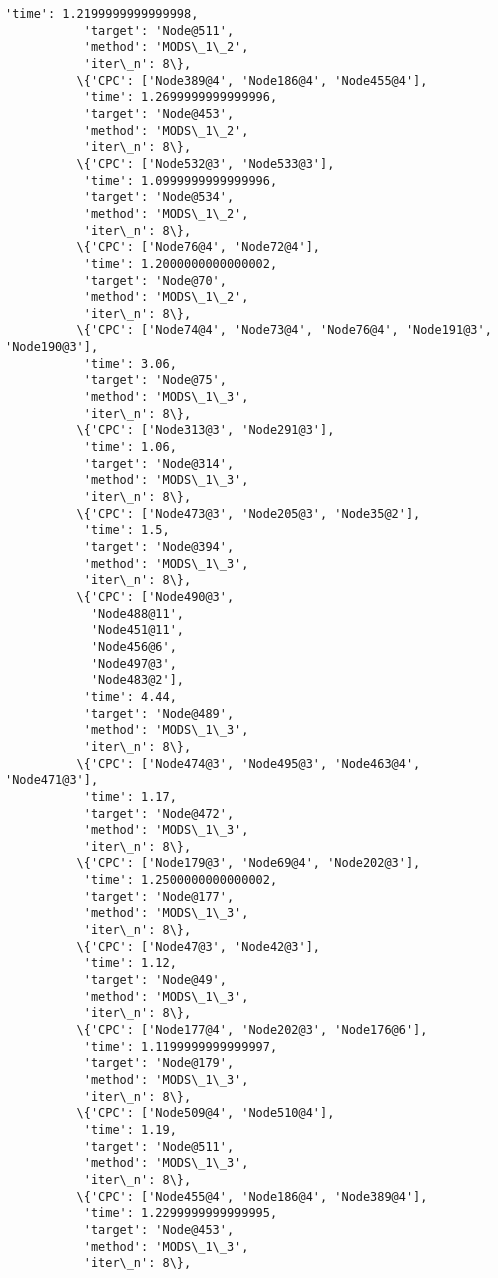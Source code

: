 \documentclass[11pt]{article}
\begin{document}
\begin{Verbatim}[commandchars=\\\{\}]
           'time': 1.2199999999999998,
           'target': 'Node@511',
           'method': 'MODS\_1\_2',
           'iter\_n': 8\},
          \{'CPC': ['Node389@4', 'Node186@4', 'Node455@4'],
           'time': 1.2699999999999996,
           'target': 'Node@453',
           'method': 'MODS\_1\_2',
           'iter\_n': 8\},
          \{'CPC': ['Node532@3', 'Node533@3'],
           'time': 1.0999999999999996,
           'target': 'Node@534',
           'method': 'MODS\_1\_2',
           'iter\_n': 8\},
          \{'CPC': ['Node76@4', 'Node72@4'],
           'time': 1.2000000000000002,
           'target': 'Node@70',
           'method': 'MODS\_1\_2',
           'iter\_n': 8\},
          \{'CPC': ['Node74@4', 'Node73@4', 'Node76@4', 'Node191@3', 'Node190@3'],
           'time': 3.06,
           'target': 'Node@75',
           'method': 'MODS\_1\_3',
           'iter\_n': 8\},
          \{'CPC': ['Node313@3', 'Node291@3'],
           'time': 1.06,
           'target': 'Node@314',
           'method': 'MODS\_1\_3',
           'iter\_n': 8\},
          \{'CPC': ['Node473@3', 'Node205@3', 'Node35@2'],
           'time': 1.5,
           'target': 'Node@394',
           'method': 'MODS\_1\_3',
           'iter\_n': 8\},
          \{'CPC': ['Node490@3',
            'Node488@11',
            'Node451@11',
            'Node456@6',
            'Node497@3',
            'Node483@2'],
           'time': 4.44,
           'target': 'Node@489',
           'method': 'MODS\_1\_3',
           'iter\_n': 8\},
          \{'CPC': ['Node474@3', 'Node495@3', 'Node463@4', 'Node471@3'],
           'time': 1.17,
           'target': 'Node@472',
           'method': 'MODS\_1\_3',
           'iter\_n': 8\},
          \{'CPC': ['Node179@3', 'Node69@4', 'Node202@3'],
           'time': 1.2500000000000002,
           'target': 'Node@177',
           'method': 'MODS\_1\_3',
           'iter\_n': 8\},
          \{'CPC': ['Node47@3', 'Node42@3'],
           'time': 1.12,
           'target': 'Node@49',
           'method': 'MODS\_1\_3',
           'iter\_n': 8\},
          \{'CPC': ['Node177@4', 'Node202@3', 'Node176@6'],
           'time': 1.1199999999999997,
           'target': 'Node@179',
           'method': 'MODS\_1\_3',
           'iter\_n': 8\},
          \{'CPC': ['Node509@4', 'Node510@4'],
           'time': 1.19,
           'target': 'Node@511',
           'method': 'MODS\_1\_3',
           'iter\_n': 8\},
          \{'CPC': ['Node455@4', 'Node186@4', 'Node389@4'],
           'time': 1.2299999999999995,
           'target': 'Node@453',
           'method': 'MODS\_1\_3',
           'iter\_n': 8\},

\end{Verbatim}
\end{document}
